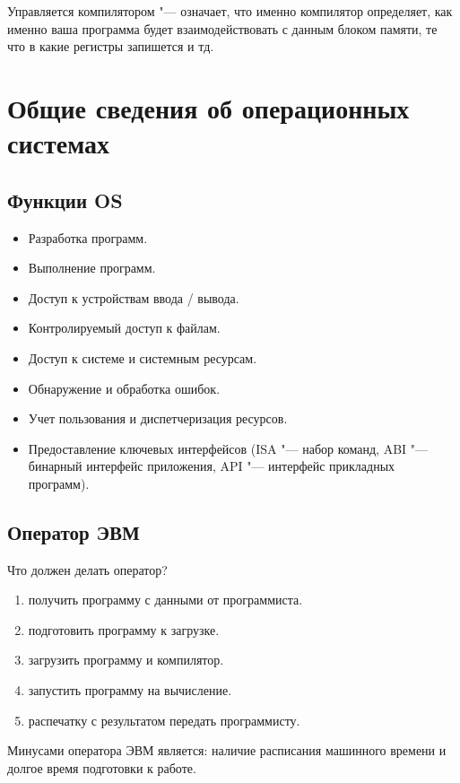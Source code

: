 \documentclass[bachelor, och, pract]{SCWorks}
\theoremstyle{remark}
\begin{document}
    Управляется компилятором "--- означает, что именно компилятор определяет, как именно ваша программа будет взаимодействовать с данным блоком памяти, те что в какие регистры запишется и тд. 


    \section{Общие сведения об операционных системах}
    
    \subsection{Функции OS}
    
    \begin{itemize}[label=$\bullet$]
        \item Разработка программ.
        \item Выполнение программ.
        \item Доступ к устройствам ввода / вывода.
        \item Контролируемый доступ к файлам.
        \item Доступ к системе и системным ресурсам.
        \item Обнаружение и обработка ошибок.
        \item Учет пользования и диспетчеризация ресурсов.
        \item Предоставление ключевых интерфейсов (ISA "--- набор команд, ABI "--- бинарный интерфейс приложения, API "--- интерфейс прикладных программ).
    \end{itemize}
    
    \subsection{Оператор ЭВМ}
    Что должен делать оператор?
    \begin{enumerate}
        \item получить программу с данными от программиста.
        \item подготовить программу к загрузке.
        \item загрузить программу и компилятор.
        \item запустить программу на вычисление.
        \item распечатку с результатом передать программисту.
    \end{enumerate}

    Минусами оператора ЭВМ является: наличие расписания машинного времени и долгое время подготовки к работе.
\end{document}
